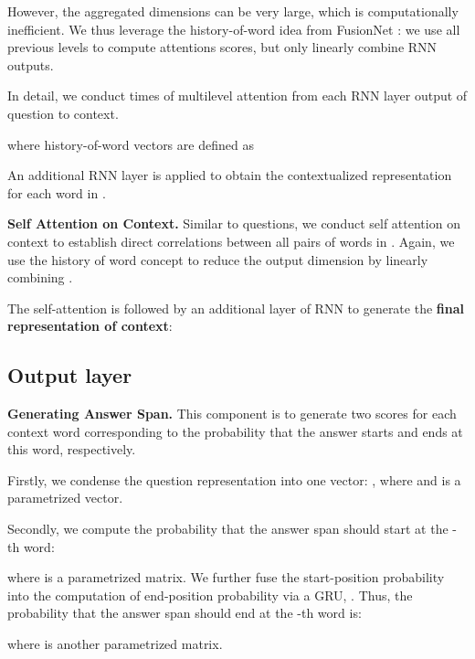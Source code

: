 \documentclass{article} \usepackage{sdnet,times}
\begin{document}
However, the aggregated dimensions can be very large, which is computationally inefficient. We thus leverage the history-of-word idea from FusionNet \citep{fusionnet}: we use all previous levels to compute attentions scores, but only linearly combine RNN outputs.

In detail, we conduct  times of multilevel attention from each RNN layer output of question to context.



where history-of-word vectors are defined as



An additional RNN layer is applied to obtain the contextualized representation  for each word in .










\textbf{Self Attention on Context.} Similar to questions, we conduct self attention on context to establish direct correlations between all pairs of words in . Again, we use the history of word concept to reduce the output dimension by linearly combining . 





The self-attention is followed by an additional layer of RNN to generate the \textbf{final representation of context}:








\subsection{Output layer}
\textbf{Generating Answer Span.} This component is to generate two scores for each context word corresponding to the probability that the answer starts and ends at this word, respectively.

Firstly, we condense the question representation into one vector: , where  and  is a parametrized vector.

Secondly, we compute the probability that the answer span should start at the -th word:

where  is a parametrized matrix. We further fuse the start-position probability into the computation of end-position probability via a GRU, . Thus, the probability that the answer span should end at the -th word is:

where  is another parametrized matrix.
\end{document}
